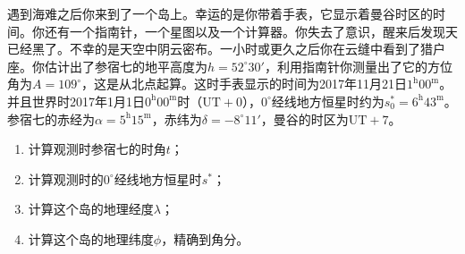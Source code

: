 \documentclass[a4paper]{article}
\begin{document}
遇到海难之后你来到了一个岛上。幸运的是你带着手表，它显示着曼谷时区的时间。你还有一个指南针，一个星图以及一个计算器。你失去了意识，醒来后发现天已经黑了。不幸的是天空中阴云密布。一小时或更久之后你在云缝中看到了猎户座。你估计出了参宿七的地平高度为$h = 52^\circ30'$，利用指南针你测量出了它的方位角为$A = 109^\circ$，这是从北点起算。这时手表显示的时间为2017年11月21日$\mathrm{1^h00^m}$。并且世界时2017年1月1日$\mathrm{0^h00^m}$时（$\mathrm{UT+0}$），$0^\circ$经线地方恒星时约为$s_0^* = \mathrm{6^h43^m}$。参宿七的赤经为$\alpha = \mathrm{5^h15^m}$，赤纬为$\delta = -8^\circ11'$，曼谷的时区为$\mathrm{UT+7}$。
\begin{enumerate}
    \item[(a)] 计算观测时参宿七的时角$t$；
    \item[(b)] 计算观测时的$0^\circ$经线地方恒星时$s^*$；
    \item[(c)] 计算这个岛的地理经度$\lambda$；
    \item[(d)] 计算这个岛的地理纬度$\phi$，精确到角分。
\end{enumerate}
\bigskip
\end{document}
